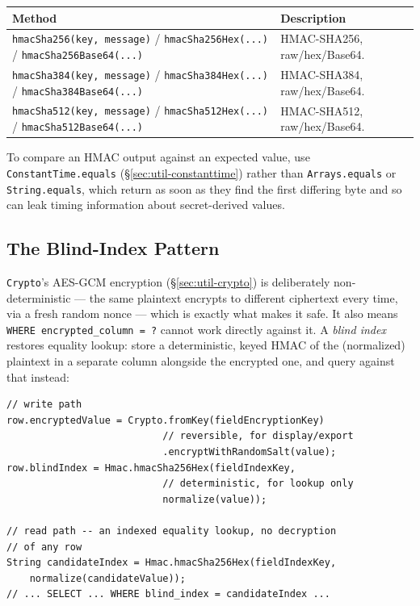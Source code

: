 \begin{longtable}{P{4.8cm}P{5.7cm}}
\toprule
\textbf{Method} & \textbf{Description} \\
\midrule
\endhead
\texttt{hmacSha256(key, message)} / \texttt{hmacSha256Hex(...)} / \texttt{hmacSha256Base64(...)} & HMAC-SHA256, raw/hex/Base64. \\
\texttt{hmacSha384(key, message)} / \texttt{hmacSha384Hex(...)} / \texttt{hmacSha384Base64(...)} & HMAC-SHA384, raw/hex/Base64. \\
\texttt{hmacSha512(key, message)} / \texttt{hmacSha512Hex(...)} / \texttt{hmacSha512Base64(...)} & HMAC-SHA512, raw/hex/Base64. \\
\bottomrule
\end{longtable}

\noindent
To compare an HMAC output against an expected value, use \texttt{ConstantTime.equals} (\S\ref{sec:util-constanttime}) rather than \texttt{Arrays.equals} or \texttt{String.equals}, which return as soon as they find the first differing byte and so can leak timing information about secret-derived values.

\subsection{The Blind-Index Pattern}

\texttt{Crypto}'s AES-GCM encryption (\S\ref{sec:util-crypto}) is deliberately non-deterministic --- the same plaintext encrypts to different ciphertext every time, via a fresh random nonce --- which is exactly what makes it safe.  It also means \texttt{WHERE encrypted\_column = ?} cannot work directly against it.  A \emph{blind index} restores equality lookup: store a deterministic, keyed HMAC of the (normalized) plaintext in a separate column alongside the encrypted one, and query against that instead:

\begin{lstlisting}[style=java]
// write path
row.encryptedValue = Crypto.fromKey(fieldEncryptionKey)
                           // reversible, for display/export
                           .encryptWithRandomSalt(value);
row.blindIndex = Hmac.hmacSha256Hex(fieldIndexKey,
                           // deterministic, for lookup only
                           normalize(value));

// read path -- an indexed equality lookup, no decryption
// of any row
String candidateIndex = Hmac.hmacSha256Hex(fieldIndexKey,
    normalize(candidateValue));
// ... SELECT ... WHERE blind_index = candidateIndex ...
\end{lstlisting}

